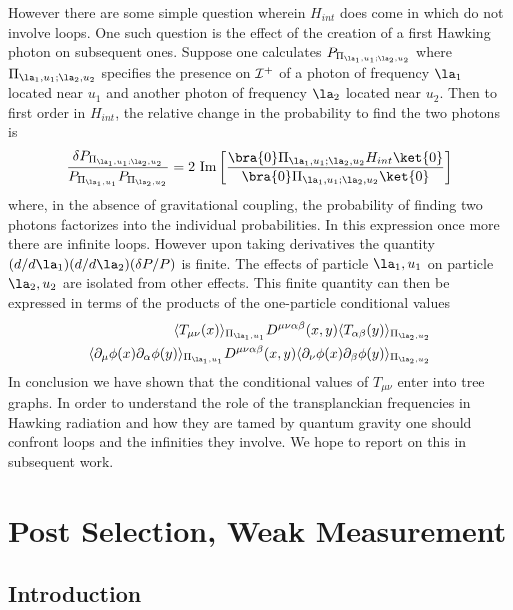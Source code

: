\documentclass[12pt]{article}
\begin{document}
However there are some simple question wherein $H_{int}$ does come in which do
not involve loops. One such question is the effect of the creation of a first
Hawking photon on subsequent ones. Suppose one calculates
$P_{\Pi_{\la_1,u_1;\la_2,u_2}}$ where $\Pi_{\la_1,u_1;\la_2,u_2}$ specifies the
presence on ${\cal I}^+$ of a photon of frequency $\la_1$ located near $u_1$
and another photon of frequency $\la_2$ located near $u_2$. Then to first order
in $H_{int}$, the relative change in the probability to find the two photons is
\begin{equation}
{ \delta P_{\Pi_{\la_1,u_1;\la_2,u_2}} \over
P_{\Pi_{\la_1,u_1}}P_{\Pi_{\la_2,u_2}} }
=
2 \mbox{ Im}\left[
{\bra {0}\Pi_{\la_1,u_1;\la_2,u_2} H_{int} \ket{0} \over
\bra {0}\Pi_{\la_1,u_1;\la_2,u_2}  \ket{0}}
\right]
\end{equation}
where, in the absence of gravitational coupling, the probability of
finding two photons factorizes into the individual
probabilities.
In this expression once more there are infinite loops. However upon taking
derivatives the quantity
$(d/d\la_1)(d/ d\la_2) (\delta P / P)$ is finite. The  effects
of particle $\la_1,u_1$ on particle $\la_2,u_2$ are
isolated from other
effects. This finite quantity can then
be expressed in terms of the
products of the one-particle conditional values
\begin{eqnarray}
\langle T_{\mu\nu}(x)\rangle_{\Pi_{\la_1,u_1}} D^{\mu \nu \alpha \beta}(x,y)
\langle T_{\alpha\beta}(y)\rangle_{\Pi_{\la_2,u_2}}\nonumber\\
\langle \partial_\mu \phi(x)\partial_\alpha
\phi(y)\rangle_{\Pi_{\la_1,u_1}} D^{\mu \nu \alpha \beta}(x,y)
\langle \partial_\nu \phi(x)\partial_\beta \phi(y)\rangle_{\Pi_{\la_2,u_2}}
\end{eqnarray}
In conclusion we have shown that the conditional values of $T_{\mu\nu}$ enter
into tree graphs. In order to understand the role of the transplanckian
frequencies in Hawking radiation and how they are tamed by quantum gravity one
should confront loops and the infinities they involve. We hope to report on
this in subsequent work.


\section {Post Selection, Weak Measurement}

\subsection{Introduction}
\end{document}
